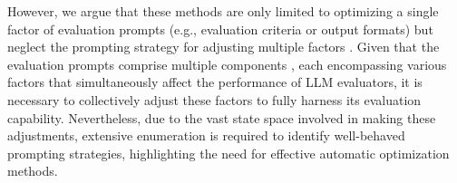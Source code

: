 
However, we argue that these methods are only limited to optimizing a single factor of evaluation prompts (e.g., evaluation criteria or output formats) but neglect the prompting strategy for adjusting multiple factors \citep{kim-etal-2023-better}. 
Given that the evaluation prompts comprise multiple components \cite{gao2024llm}, each encompassing various factors that simultaneously affect the performance of LLM evaluators, it is necessary to collectively adjust these factors to fully harness its evaluation capability. 
Nevertheless, due to the vast state space involved in making these adjustments, extensive enumeration is required to identify well-behaved prompting strategies, highlighting the need for effective automatic optimization methods.

